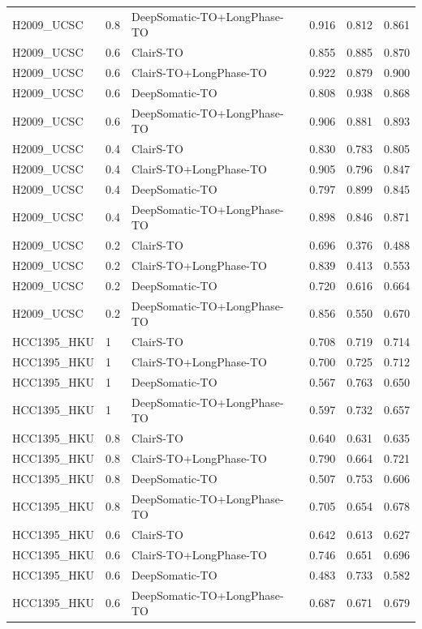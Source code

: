 \documentclass[pdflatex,sn-nature]{sn-jnl}
\begin{document}
{\begin{longtable}{@{}lllccc@{}}
  H2009\_UCSC & 0.8 & DeepSomatic-TO+LongPhase-TO & 0.916 & 0.812 & 0.861 \\
  H2009\_UCSC & 0.6 & ClairS-TO & 0.855 & 0.885 & 0.870 \\
  H2009\_UCSC & 0.6 & ClairS-TO+LongPhase-TO & 0.922 & 0.879 & 0.900 \\
  H2009\_UCSC & 0.6 & DeepSomatic-TO & 0.808 & 0.938 & 0.868 \\
  H2009\_UCSC & 0.6 & DeepSomatic-TO+LongPhase-TO & 0.906 & 0.881 & 0.893 \\
  H2009\_UCSC & 0.4 & ClairS-TO & 0.830 & 0.783 & 0.805 \\
  H2009\_UCSC & 0.4 & ClairS-TO+LongPhase-TO & 0.905 & 0.796 & 0.847 \\
  H2009\_UCSC & 0.4 & DeepSomatic-TO & 0.797 & 0.899 & 0.845 \\
  H2009\_UCSC & 0.4 & DeepSomatic-TO+LongPhase-TO & 0.898 & 0.846 & 0.871 \\
  H2009\_UCSC & 0.2 & ClairS-TO & 0.696 & 0.376 & 0.488 \\
  H2009\_UCSC & 0.2 & ClairS-TO+LongPhase-TO & 0.839 & 0.413 & 0.553 \\
  H2009\_UCSC & 0.2 & DeepSomatic-TO & 0.720 & 0.616 & 0.664 \\
  H2009\_UCSC & 0.2 & DeepSomatic-TO+LongPhase-TO & 0.856 & 0.550 & 0.670 \\
  HCC1395\_HKU & 1 & ClairS-TO & 0.708 & 0.719 & 0.714 \\
  HCC1395\_HKU & 1 & ClairS-TO+LongPhase-TO & 0.700 & 0.725 & 0.712 \\
  HCC1395\_HKU & 1 & DeepSomatic-TO & 0.567 & 0.763 & 0.650 \\
  HCC1395\_HKU & 1 & DeepSomatic-TO+LongPhase-TO & 0.597 & 0.732 & 0.657 \\
  HCC1395\_HKU & 0.8 & ClairS-TO & 0.640 & 0.631 & 0.635 \\
  HCC1395\_HKU & 0.8 & ClairS-TO+LongPhase-TO & 0.790 & 0.664 & 0.721 \\
  HCC1395\_HKU & 0.8 & DeepSomatic-TO & 0.507 & 0.753 & 0.606 \\
  HCC1395\_HKU & 0.8 & DeepSomatic-TO+LongPhase-TO & 0.705 & 0.654 & 0.678 \\
  HCC1395\_HKU & 0.6 & ClairS-TO & 0.642 & 0.613 & 0.627 \\
  HCC1395\_HKU & 0.6 & ClairS-TO+LongPhase-TO & 0.746 & 0.651 & 0.696 \\
  HCC1395\_HKU & 0.6 & DeepSomatic-TO & 0.483 & 0.733 & 0.582 \\
  HCC1395\_HKU & 0.6 & DeepSomatic-TO+LongPhase-TO & 0.687 & 0.671 & 0.679 \\

\end{longtable}}
\end{document}
